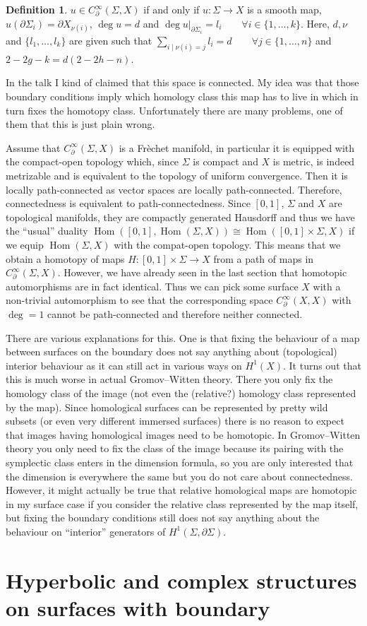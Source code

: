 \documentclass[a4paper]{article}
\newcommand{\si}{\Sigma}
\newcommand{\del}{\partial}
\newcommand{\cin}{C^{\infty}}
\newcommand{\lra}{\longrightarrow}
\newcommand{\Hom}{\operatorname{Hom}}
\theoremstyle{definition}
\newtheorem*{definition}{Definition}
\theoremstyle{remark}
\theoremstyle{remark}
\begin{document}
\begin{definition}
  $u\in\cin_{\del}(\si,X)$ if and only if $u:\si\lra X$ is a smooth map, $u(\del\si_i)=\del X_{\nu(i)}$, $\deg u =d$ and $\deg u|_{\del\si_i}=l_i\qquad\forall i\in\{1,\ldots,k\}$. Here, $d,\nu$ and $\{l_1,\ldots,l_k\}$ are given such that $\sum_{i\mid \nu(i)=j}l_i=d\qquad\forall j\in\{1,\ldots,n\}$ and $2-2g-k=d(2-2h-n)$. 
\end{definition}

In the talk I kind of claimed that this space is connected. My idea was that those boundary conditions imply which homology class this map has to live in which in turn fixes the homotopy class. Unfortunately there are many problems, one of them that this is just plain wrong.

Assume that $\cin_{\del}(\si,X)$ is a Fr\`echet manifold, in particular it is equipped with the compact-open topology which, since $\si$ is compact and $X$  is metric, is indeed metrizable and is equivalent to the topology of uniform convergence. Then it is locally path-connected as vector spaces are locally path-connected. Therefore, connectedness is equivalent to path-connectedness. Since $[0,1]$, $\si$ and $X$ are topological manifolds, they are compactly generated Hausdorff and thus we have the ``usual'' duality $\Hom([0,1],\Hom(\si,X))\cong \Hom([0,1]\times\si,X)$ if we equip $\Hom(\si,X)$ with the compat-open topology. This means that we obtain a homotopy of maps $H:[0,1]\times \si\lra X$ from a path of maps in $\cin_{\del}(\si,X)$. However, we have already seen in the last section that homotopic automorphisms are in fact identical. Thus we can pick some surface $X$ with a non-trivial automorphism to see that the corresponding space $\cin_{\del}(X,X)$ with $\deg=1$ cannot be path-connected and therefore neither connected.

There are various explanations for this. One is that fixing the behaviour of a map between surfaces on the boundary does not say anything about (topological) interior behaviour as it can still act in various ways on $H^{1}(X)$. It turns out that this is much worse in actual Gromov--Witten theory. There you only fix the homology class of the image (not even the (relative?) homology class represented by the map). Since homological surfaces can be represented by pretty wild subsets (or even very different immersed surfaces) there is no reason to expect that images having homological images need to be homotopic. In Gromov--Witten theory you only need to fix the class of the image because its pairing with the symplectic class enters in the dimension formula, so you are only interested that the dimension is everywhere the same but you do not care about connectedness. However, it might actually be true that relative homological maps are homotopic in my surface case if you consider the relative class represented by the map itself, but fixing the boundary conditions still does not say anything about the behaviour on ``interior'' generators of $H^1(\si,\del\si)$.


\section*{Hyperbolic and complex structures on surfaces with boundary}
\end{document}
